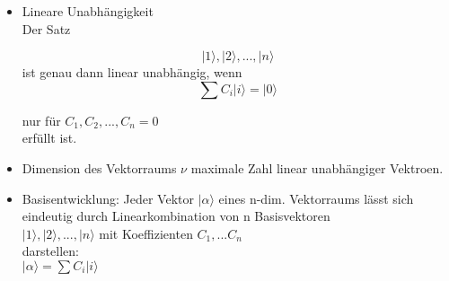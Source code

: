 \documentclass[10pt,article,colorback,accentcolor=tud9d]{scrartcl}
\begin{document}
\begin{itemize}
\begin{fleqn}
\begin{itemize}
\begin{equation}
\rangle \right.
\end{equation}
\item Assoziativität der Addition: 
\begin{equation}
\left|\alpha\rangle \right. + (\left|\beta\rangle \right. + \left|\gamma\rangle \right.) = (\left|
\alpha\rangle \right. + \left|\beta\rangle \right.)+\left|\gamma\rangle \right.
\end{equation}
\item Nullvektor: 
\begin{equation}
\begin{aligned}
\left|\alpha\rangle \right. +\left|0\rangle \right. = \left|\alpha\rangle \right.\\
0 \left|\alpha\rangle \right. = \left|0\rangle \right.\\
C \left|0\rangle \right. = \left|0\rangle \right.
\end{aligned}
\end{equation}
\item Inverses Element bezüglich Addition:
\begin{equation}
\begin{aligned}
\left|\alpha\rangle \right. + \left|{\alpha}_{inv}\rangle \right. = \left|0\rangle \right.\\
\left|{\alpha}_{inv}\rangle \right. = -\left|\alpha\rangle \right.
\end{aligned}
\end{equation}
\end{itemize}
\end{fleqn}
\item Lineare Unabhängigkeit\\
Der Satz
\begin{fleqn}
\begin{equation} \nonumber
{\left|1\rangle \right.,\left|2\rangle \right.,...,\left|n\rangle \right.}
\end{equation}
ist genau dann linear unabhängig, wenn
\begin{equation}
\sum {C}_i \left|i\rangle \right. = \left|0\rangle \right.
\end{equation}
\end{fleqn}
nur für ${C}_1, {C}_2,...,{C}_n=0$\\
erfüllt ist.
\item Dimension des Vektorraums $\nu$ maximale Zahl linear unabhängiger 
Vektroen. 
\item Basisentwicklung: Jeder Vektor $\left|\alpha\rangle \right.$ eines n-dim. 
Vektorraums lässt sich eindeutig durch Linearkombination von n Basisvektoren \\
${\left|1\rangle \right.,\left|2\rangle \right.,...,\left|n\rangle \right.}$ mit Koeffizienten ${C}
_1,...{C}_n$\\
darstellen:\\
$\left|\alpha\rangle \right. = \sum {C}_i \left|i\rangle \right.$
\end{itemize}
\end{document}
